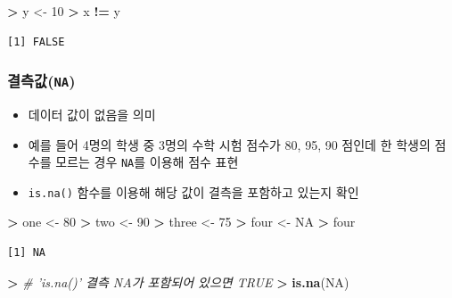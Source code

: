 \documentclass[11pt,a4paper]{book}
\newenvironment{Shaded}{\begin{snugshade}}{\end{snugshade}}
\newcommand{\KeywordTok}[1]{\textcolor[rgb]{0.13,0.29,0.53}{\textbf{#1}}}
\newcommand{\DecValTok}[1]{\textcolor[rgb]{0.00,0.00,0.81}{#1}}
\newcommand{\StringTok}[1]{\textcolor[rgb]{0.31,0.60,0.02}{#1}}
\newcommand{\CommentTok}[1]{\textcolor[rgb]{0.56,0.35,0.01}{\textit{#1}}}
\newcommand{\OtherTok}[1]{\textcolor[rgb]{0.56,0.35,0.01}{#1}}
\newcommand{\OperatorTok}[1]{\textcolor[rgb]{0.81,0.36,0.00}{\textbf{#1}}}
\newcommand{\ErrorTok}[1]{\textcolor[rgb]{0.64,0.00,0.00}{\textbf{#1}}}
\newcommand{\NormalTok}[1]{#1}
\providecommand{\tightlist}{%
  \setlength{\itemsep}{0pt}\setlength{\parskip}{0pt}}
\theoremstyle{definition}
\theoremstyle{definition}
\theoremstyle{definition}
\theoremstyle{remark}
\begin{document}
\begin{Shaded}
\begin{Highlighting}[]
\OperatorTok{>}\StringTok{ }\NormalTok{y <-}\StringTok{ }\DecValTok{10}
\OperatorTok{>}\StringTok{ }\NormalTok{x }\OperatorTok{!=}\StringTok{ }\NormalTok{y}
\end{Highlighting}
\end{Shaded}

\begin{verbatim}
[1] FALSE
\end{verbatim}

\normalsize

\subsubsection{\texorpdfstring{결측값(\texttt{NA})}{결측값(NA)}}\label{na}

\begin{itemize}
\tightlist
\item
  데이터 값이 없음을 의미
\item
  예를 들어 4명의 학생 중 3명의 수학 시험 점수가 80, 95, 90 점인데 한
  학생의 점수를 모르는 경우 \texttt{NA}를 이용해 점수 표현
\item
  \texttt{is.na()} 함수를 이용해 해당 값이 결측을 포함하고 있는지 확인
\end{itemize}

\footnotesize

\begin{Shaded}
\begin{Highlighting}[]
\OperatorTok{>}\StringTok{ }\NormalTok{one <-}\StringTok{ }\DecValTok{80}
\OperatorTok{>}\StringTok{ }\NormalTok{two <-}\StringTok{ }\DecValTok{90}
\OperatorTok{>}\StringTok{ }\NormalTok{three <-}\StringTok{ }\DecValTok{75}
\OperatorTok{>}\StringTok{ }\NormalTok{four <-}\StringTok{ }\OtherTok{NA}
\OperatorTok{>}\StringTok{ }\NormalTok{four}
\end{Highlighting}
\end{Shaded}

\begin{verbatim}
[1] NA
\end{verbatim}

\begin{Shaded}
\begin{Highlighting}[]
\OperatorTok{>}\StringTok{ }\CommentTok{# 'is.na()' 결측 NA가 포함되어 있으면 TRUE}
\ErrorTok{>}\StringTok{ }\KeywordTok{is.na}\NormalTok{(}\OtherTok{NA}\NormalTok{)}
\end{Highlighting}
\end{Shaded}
\end{document}
